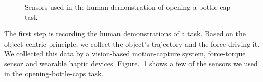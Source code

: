 \begin{figure}
  \centering
    \caption{\scriptsize{Sensors used in the human demonstration of
        opening a bottle cap task}
      }
  \label{fig:devices}
\end{figure}

The first step is recording the human demonstrations of a task. Based on the object-centric principle, we collect the object's trajectory and the force driving it. %
We collected this data by a vision-based motion-capture system,
force-torque sensor and wearable haptic
devices. Figure.~\ref{fig:devices} shows a few of the sensors we used
in the opening-bottle-caps task. %



